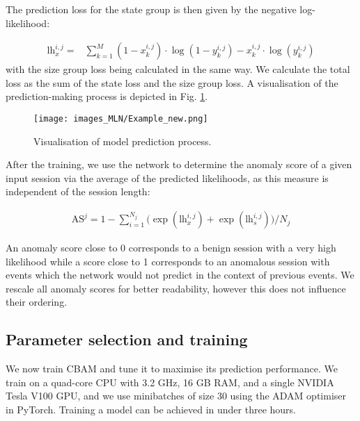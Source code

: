 The prediction loss for the state group is then given by the negative log-likelihood:

\begin{align*}
\text{lh}_x^{i,j}=&\sum_{k=1}^{M}(1-x^{i,j}_{k})\cdot\log(1-y^{i,j}_{k})-x^{i,j}_{k}\cdot\log(y^{i,j}_{k})\nonumber
\end{align*}
with the size group loss being calculated in the same way. We calculate the total loss as the sum of the state loss and the size group loss. A visualisation of the prediction-making process is depicted in Fig. \ref{figF:Modelpred}.



\begin{figure}
\centering
\texttt{[image: images\_MLN/Example\_new.png]} 
\caption{Visualisation of model prediction process.}\label{figF:Modelpred}
\end{figure}


After the training, we use the network to determine the anomaly score of a given input session via the average of the predicted likelihoods, as this measure is independent of the session length: 

\begin{align*}
\text{AS}^j=1-\sum_{i=1}^{N_j}\Big(\exp(\text{lh}_x^{i,j})+\exp(\text{lh}_s^{i,j})\Big)/N_j
\end{align*}

An anomaly score close to 0 corresponds to a benign session with a very high likelihood while a score close to 1 corresponds to an anomalous session with events which the network would not predict in the context of previous events. We rescale all anomaly scores for better readability, however this does not influence their ordering.


\subsection{Parameter selection and training}

We now train CBAM and tune it to maximise its prediction performance. We train on a quad-core CPU with 3.2 GHz, 16 GB RAM, and a single NVIDIA Tesla V100 GPU, and we use minibatches of size 30 using the ADAM optimiser in PyTorch. Training a model can be achieved in under three hours.

